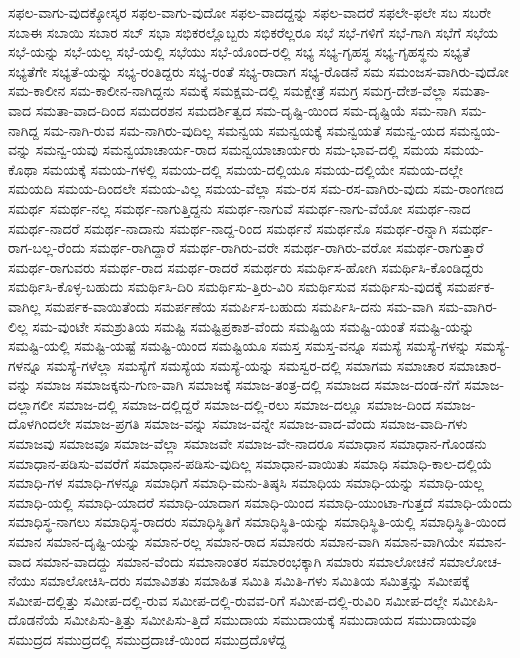 {ಸಫಲ-ವಾಗು-ವುದಕ್ಕೋಸ್ಕರ
ಸಫಲ-ವಾಗು-ವುದೋ
ಸಫಲ-ವಾದದ್ದನ್ನು
ಸಫಲ-ವಾದರೆ
ಸಫಲೇ-ಫಲೇ
ಸಬ
ಸಬರೇ
ಸಬಾಈ
ಸಬಾಯಿ
ಸಬಾರ
ಸಬ್
ಸಭಾ
ಸಭಿಕರಲ್ಲೊಬ್ಬರು
ಸಭಿಕರೆಲ್ಲರೂ
ಸಭೆ
ಸಭೆ-ಗಳಿಗೆ
ಸಭೆ-ಗಾಗಿ
ಸಭೆಗೆ
ಸಭೆಯ
ಸಭೆ-ಯನ್ನು
ಸಭೆ-ಯಲ್ಲ
ಸಭೆ-ಯಲ್ಲಿ
ಸಭೆಯು
ಸಭೆ-ಯೊಂದ-ರಲ್ಲಿ
ಸಭ್ಯ
ಸಭ್ಯ-ಗೃಹಸ್ಥ
ಸಭ್ಯ-ಗೃಹಸ್ಥನು
ಸಭ್ಯತೆ
ಸಭ್ಯತೆಗೇ
ಸಭ್ಯತೆ-ಯನ್ನು
ಸಭ್ಯ-ರಂತಿದ್ದರು
ಸಭ್ಯ-ರಂತೆ
ಸಭ್ಯ-ರಾದಾಗ
ಸಭ್ಯ-ರೊಡನೆ
ಸಮ
ಸಮಂಜಸ-ವಾಗಿರು-ವುದೋ
ಸಮ-ಕಾಲೀನ
ಸಮ-ಕಾಲೀನ-ನಾಗಿದ್ದನು
ಸಮಕ್ಕೆ
ಸಮಕ್ಷಮ-ದಲ್ಲಿ
ಸಮಕ್ಷೇತ್ರೆ
ಸಮಗ್ರ
ಸಮಗ್ರ-ದೇಶ-ವೆಲ್ಲಾ
ಸಮತಾ-ವಾದ
ಸಮತಾ-ವಾದ-ದಿಂದ
ಸಮದರಶನ
ಸಮದರ್ಶಿತ್ವದ
ಸಮ-ದೃಷ್ಟಿ-ಯಿಂದ
ಸಮ-ದೃಷ್ಟಿಯೆ
ಸಮ-ನಾಗಿ
ಸಮ-ನಾಗಿದ್ದ
ಸಮ-ನಾಗಿ-ರುವ
ಸಮ-ನಾಗಿರು-ವುದಿಲ್ಲ
ಸಮನ್ವಯ
ಸಮನ್ವಯಕ್ಕೆ
ಸಮನ್ವಯತೆ
ಸಮನ್ವ-ಯದ
ಸಮನ್ವಯ-ವನ್ನು
ಸಮನ್ವ-ಯವು
ಸಮನ್ವಯಾಚಾರ್ಯ-ರಾದ
ಸಮನ್ವಯಾಚಾರ್ಯರು
ಸಮ-ಭಾವ-ದಲ್ಲಿ
ಸಮಯ
ಸಮಯ-ಕೊಥಾ
ಸಮಯಕ್ಕೆ
ಸಮಯ-ಗಳಲ್ಲಿ
ಸಮಯ-ದಲ್ಲಿ
ಸಮಯ-ದಲ್ಲಿಯೂ
ಸಮಯ-ದಲ್ಲಿಯೇ
ಸಮಯ-ದಲ್ಲೇ
ಸಮಯದಿ
ಸಮಯ-ದಿಂದಲೇ
ಸಮಯ-ವಿಲ್ಲ
ಸಮಯ-ವೆಲ್ಲಾ
ಸಮ-ರಸ
ಸಮ-ರಸ-ವಾಗಿರು-ವುದು
ಸಮ-ರಾಂಗಣದ
ಸಮರ್ಥ
ಸಮರ್ಥ-ನಲ್ಲ
ಸಮರ್ಥ-ನಾಗುತ್ತಿದ್ದನು
ಸಮರ್ಥ-ನಾಗುವೆ
ಸಮರ್ಥ-ನಾಗು-ವೆಯೋ
ಸಮರ್ಥ-ನಾದ
ಸಮರ್ಥ-ನಾದರೆ
ಸಮರ್ಥ-ನಾದಾನು
ಸಮರ್ಥ-ನಾದ್ದ-ರಿಂದ
ಸಮರ್ಥನೆ
ಸಮರ್ಥನೊ
ಸಮರ್ಥ-ರನ್ನಾಗಿ
ಸಮರ್ಥ-ರಾಗ-ಬಲ್ಲ-ರೆಂದು
ಸಮರ್ಥ-ರಾಗಿದ್ದಾರೆ
ಸಮರ್ಥ-ರಾಗಿರು-ವರೇ
ಸಮರ್ಥ-ರಾಗಿರು-ವರೋ
ಸಮರ್ಥ-ರಾಗುತ್ತಾರೆ
ಸಮರ್ಥ-ರಾಗುವರು
ಸಮರ್ಥ-ರಾದ
ಸಮರ್ಥ-ರಾದರೆ
ಸಮರ್ಥರು
ಸಮರ್ಥಿಸ-ಹೋಗಿ
ಸಮರ್ಥಿಸಿ-ಕೊಂಡಿದ್ದರು
ಸಮರ್ಥಿಸಿ-ಕೊಳ್ಳ-ಬಹುದು
ಸಮರ್ಥಿಸಿ-ದಿರಿ
ಸಮರ್ಥಿಸು-ತ್ತಿರು-ವಿರಿ
ಸಮರ್ಥಿಸುವ
ಸಮರ್ಥಿಸು-ವುದಕ್ಕೆ
ಸಮರ್ಪಕ-ವಾಗಿಲ್ಲ
ಸಮರ್ಪಕ-ವಾಯಿತೆಂದು
ಸಮರ್ಪಣೆಯ
ಸಮರ್ಪಿಸ-ಬಹುದು
ಸಮರ್ಪಿಸಿ-ದನು
ಸಮ-ವಾಗಿ
ಸಮ-ವಾಗಿರ-ಲಿಲ್ಲ
ಸಮ-ವುಂಟೇ
ಸಮಶ್ರುತಿಯ
ಸಮಷ್ಟಿ
ಸಮಷ್ಟಿಪ್ರಕಾಶ-ವೆಂದು
ಸಮಷ್ಟಿಯ
ಸಮಷ್ಟಿ-ಯಂತೆ
ಸಮಷ್ಟಿ-ಯನ್ನು
ಸಮಷ್ಟಿ-ಯಲ್ಲಿ
ಸಮಷ್ಟಿ-ಯಷ್ಟೆ
ಸಮಷ್ಟಿ-ಯಿಂದ
ಸಮಷ್ಟಿಯೂ
ಸಮಸ್ತ
ಸಮಸ್ತ-ವನ್ನೂ
ಸಮಸ್ಯೆ
ಸಮಸ್ಯೆ-ಗಳನ್ನು
ಸಮಸ್ಯೆ-ಗಳನ್ನೂ
ಸಮಸ್ಯೆ-ಗಳೆಲ್ಲಾ
ಸಮಸ್ಯೆಗೆ
ಸಮಸ್ಯೆಯ
ಸಮಸ್ಯೆ-ಯನ್ನು
ಸಮಸ್ವರ-ದಲ್ಲಿ
ಸಮಾಗಮ
ಸಮಾಚಾರ
ಸಮಾಚಾರ-ವನ್ನು
ಸಮಾಜ
ಸಮಾಜಕ್ಕನು-ಗುಣ-ವಾಗಿ
ಸಮಾಜಕ್ಕೆ
ಸಮಾಜ-ತಂತ್ರ-ದಲ್ಲಿ
ಸಮಾಜದ
ಸಮಾಜ-ದಂಡ-ನೆಗೆ
ಸಮಾಜ-ದಲ್ಲಾಗಲೀ
ಸಮಾಜ-ದಲ್ಲಿ
ಸಮಾಜ-ದಲ್ಲಿದ್ದರೆ
ಸಮಾಜ-ದಲ್ಲಿ-ರಲು
ಸಮಾಜ-ದಲ್ಲೂ
ಸಮಾಜ-ದಿಂದ
ಸಮಾಜ-ದೊಳಗಿಂದಲೇ
ಸಮಾಜ-ಪ್ರಗತಿ
ಸಮಾಜ-ವನ್ನು
ಸಮಾಜ-ವನ್ನೇ
ಸಮಾಜ-ವಾದ-ವೆಂದು
ಸಮಾಜ-ವಾದಿ-ಗಳು
ಸಮಾಜವು
ಸಮಾಜವೂ
ಸಮಾಜ-ವೆಲ್ಲಾ
ಸಮಾಜವೇ
ಸಮಾಜ-ವೇ-ನಾದರೂ
ಸಮಾಧಾನ
ಸಮಾಧಾನ-ಗೊಂಡನು
ಸಮಾಧಾನ-ಪಡಿಸು-ವವರೆಗೆ
ಸಮಾಧಾನ-ಪಡಿಸು-ವುದಿಲ್ಲ
ಸಮಾಧಾನ-ವಾಯಿತು
ಸಮಾಧಿ
ಸಮಾಧಿ-ಕಾಲ-ದಲ್ಲಿಯೆ
ಸಮಾಧಿ-ಗಳ
ಸಮಾಧಿ-ಗಳನ್ನೂ
ಸಮಾಧಿಗೆ
ಸಮಾಧಿ-ಮನು-ತಿಷ್ಠಸಿ
ಸಮಾಧಿಯ
ಸಮಾಧಿ-ಯನ್ನು
ಸಮಾಧಿ-ಯಲ್ಲ
ಸಮಾಧಿ-ಯಲ್ಲಿ
ಸಮಾಧಿ-ಯಾದರೆ
ಸಮಾಧಿ-ಯಾದಾಗ
ಸಮಾಧಿ-ಯಿಂದ
ಸಮಾಧಿ-ಯುಂಟಾ-ಗುತ್ತದೆ
ಸಮಾಧಿ-ಯೆಂದು
ಸಮಾಧಿಸ್ಥ-ನಾಗಲು
ಸಮಾಧಿಸ್ಥ-ರಾದರು
ಸಮಾಧಿಸ್ಥಿತಿಗೆ
ಸಮಾಧಿಸ್ಥಿತಿ-ಯನ್ನು
ಸಮಾಧಿಸ್ಥಿತಿ-ಯಲ್ಲಿ
ಸಮಾಧಿಸ್ಥಿತಿ-ಯಿಂದ
ಸಮಾನ
ಸಮಾನ-ದೃಷ್ಟಿ-ಯನ್ನು
ಸಮಾನ-ರಲ್ಲ
ಸಮಾನ-ರಾದ
ಸಮಾನರು
ಸಮಾನ-ವಾಗಿ
ಸಮಾನ-ವಾಗಿಯೇ
ಸಮಾನ-ವಾದ
ಸಮಾನ-ವಾದದ್ದು
ಸಮಾನ-ವೆಂದು
ಸಮಾನಾಂತರ
ಸಮಾರಂಭಕ್ಕಾಗಿ
ಸಮಾರು
ಸಮಾಲೋಚನೆ
ಸಮಾಲೋಚ-ನೆಯು
ಸಮಾಲೋಚಿಸಿ-ದರು
ಸಮಾವಿಶತು
ಸಮಾಹಿತ
ಸಮಿತಿ
ಸಮಿತಿ-ಗಳು
ಸಮಿತಿಯ
ಸಮಿತ್ತನ್ನು
ಸಮೀಪಕ್ಕೆ
ಸಮೀಪ-ದಲ್ಲಿತ್ತು
ಸಮೀಪ-ದಲ್ಲಿ-ರುವ
ಸಮೀಪ-ದಲ್ಲಿ-ರುವವ-ರಿಗೆ
ಸಮೀಪ-ದಲ್ಲಿ-ರುವಿರಿ
ಸಮೀಪ-ದಲ್ಲೇ
ಸಮೀಪಿಸಿ-ದೊಡನೆಯೆ
ಸಮೀಪಿಸು-ತ್ತಿತ್ತು
ಸಮೀಪಿಸು-ತ್ತಿದೆ
ಸಮುದಾಯ
ಸಮುದಾಯಕ್ಕೆ
ಸಮುದಾಯದ
ಸಮುದಾಯವೂ
ಸಮುದ್ರದ
ಸಮುದ್ರದಲ್ಲಿ
ಸಮುದ್ರದಾಚೆ-ಯಿಂದ
ಸಮುದ್ರದೊಳೆದ್ದ
}
